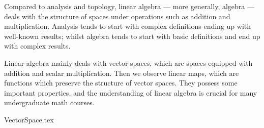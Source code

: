 \label{chap:linalg}

Compared to analysis and topology,
linear algebra --- more generally, algebra ---
deals with the structure of spaces
under operations such as addition and multiplication.
Analysis tends to
start with complex definitions ending up with well-known results;
whilst algebra tends to
start with basic definitions and end up with complex results.

Linear algebra mainly deals with vector spaces,
which are spaces equipped with addition and scalar multiplication.
Then we observe linear maps,
which are functions which preserve the structure of vector spaces.
They possess some important properties,
and the understanding of linear algebra is crucial
for many undergraduate math courses.

{VectorSpace.tex}
